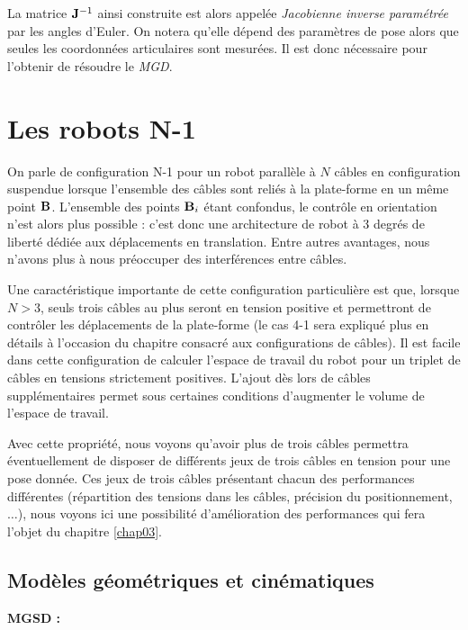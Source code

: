 La matrice ${\bf J}^{-1}$ ainsi construite est alors appelée {\it Jacobienne 
inverse para\-m\'etr\'ee} par les angles d'Euler. On notera qu'elle dépend des 
paramètres de pose alors que seules les coordonnées articulaires sont mesurées. 
Il est donc nécessaire pour l'obtenir de résoudre le {\it MGD}.

\section{Les robots N-1} \label{chap0-3}

On parle de configuration N-1 pour un robot parall\`ele \`a $N$ c\^ables en 
configuration suspendue lorsque l'ensemble des c\^ables sont reli\'es \`a la 
plate-forme en un m\^eme point ${\bf B}$. L'ensemble des points ${\bf B}_i$ 
étant confondus, le contr\^ole en orientation n'est alors plus possible : c'est 
donc une architecture de robot à 3 degrés de liberté d\'edi\'ee aux 
d\'eplacements en translation. Entre autres avantages, nous n'avons plus \`a 
nous pr\'eoccuper des interf\'erences entre c\^ables.

Une caractéristique importante de cette configuration particulière est 
que, lorsque $N > 3$, seuls trois c\^ables au plus seront en tension positive 
et permettront de contr\^oler les d\'eplacements de la plate-forme 
\cite{merlet2012} (le cas 4-1 sera expliqu\'e plus en d\'etails \`a l'occasion 
du chapitre consacr\'e aux configurations de c\^ables). Il est facile dans 
cette configuration de calculer l'espace de travail du robot pour un triplet de 
câbles en tensions strictement positives. L'ajout dès lors de câbles 
supplémentaires permet sous certaines conditions d'augmenter le volume de 
l'espace de travail.

Avec cette propriété, nous voyons qu'avoir plus de trois câbles permettra 
éventuellement de disposer de différents jeux de trois câbles en tension pour 
une pose donnée. Ces jeux de trois câbles présentant chacun des performances 
différentes (répartition des tensions dans les câbles, précision du 
positionnement, $\dots$), nous voyons ici une possibilité d'amélioration des 
performances qui fera l'objet du chapitre \ref{chap03}.

\subsection{Mod\`eles g\'eom\'etriques et cin\'ematiques} \label{chap0-3-0}

{\bf MGSD :}\\

